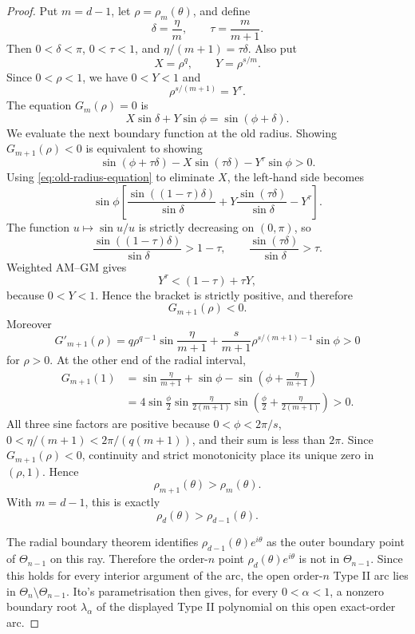 \documentclass[11pt]{article}
\theoremstyle{definition}
\theoremstyle{remark}
\begin{document}
\begin{proof}
Put $m=d-1$, let $\rho=\rho_m(\theta)$, and define
\[
        \delta=\frac{\eta}{m},
        \qquad
        \tau=\frac{m}{m+1} .
\]
Then $0<\delta<\pi$, $0<\tau<1$, and $\eta/(m+1)=\tau\delta$.  Also put
\[
        X=\rho^q,
        \qquad
        Y=\rho^{s/m} .
\]
Since $0<\rho<1$, we have $0<Y<1$ and
\[
        \rho^{s/(m+1)}=Y^\tau .
\]
The equation $G_m(\rho)=0$ is
\begin{equation}
        X\sin\delta+Y\sin\phi=\sin(\phi+\delta).
        \label{eq:old-radius-equation}
\end{equation}
We evaluate the next boundary function at the old radius.  Showing $G_{m+1}(\rho)<0$ is equivalent to showing
\[
        \sin(\phi+\tau\delta)
        -X\sin(\tau\delta)
        -Y^\tau\sin\phi
        >0 .
\]
Using \eqref{eq:old-radius-equation} to eliminate $X$, the left-hand side becomes
\[
        \sin\phi
        \left[
        \frac{\sin((1-\tau)\delta)}{\sin\delta}
        +
        Y\frac{\sin(\tau\delta)}{\sin\delta}
        -
        Y^\tau
        \right].
\]
The function $u\mapsto \sin u/u$ is strictly decreasing on $(0,\pi)$, so
\[
        \frac{\sin((1-\tau)\delta)}{\sin\delta}>1-\tau,
        \qquad
        \frac{\sin(\tau\delta)}{\sin\delta}>\tau .
\]
Weighted AM--GM gives
\[
        Y^\tau<(1-\tau)+\tau Y,
\]
because $0<Y<1$.  Hence the bracket is strictly positive, and therefore
\[
        G_{m+1}(\rho)<0 .
\]
Moreover
\[
        G'_{m+1}(\rho)
        =
        q\rho^{q-1}\sin\frac{\eta}{m+1}
        +
        \frac{s}{m+1}\rho^{s/(m+1)-1}\sin\phi
        >0
\]
for $\rho>0$. At the other end of the radial interval,
\[
\begin{aligned}
G_{m+1}(1)
&=\sin\frac{\eta}{m+1}+\sin\phi
  -\sin\left(\phi+\frac{\eta}{m+1}\right)\\
&=4\sin\frac{\phi}{2}
    \sin\frac{\eta}{2(m+1)}
    \sin\left(\frac{\phi}{2}+\frac{\eta}{2(m+1)}\right)>0.
\end{aligned}
\]
All three sine factors are positive because
$0<\phi<2\pi/s$, $0<\eta/(m+1)<2\pi/(q(m+1))$, and their sum is less than $2\pi$. Since $G_{m+1}(\rho)<0$, continuity and strict monotonicity place its unique zero in $(\rho,1)$. Hence
\[
        \rho_{m+1}(\theta)>\rho_m(\theta).
\]
With $m=d-1$, this is exactly
\[
        \rho_d(\theta)>\rho_{d-1}(\theta).
\]

The radial boundary theorem identifies $\rho_{d-1}(\theta)e^{i\theta}$ as the outer boundary point of $\Theta_{n-1}$ on this ray.  Therefore the order-$n$ point $\rho_d(\theta)e^{i\theta}$ is not in $\Theta_{n-1}$.  Since this holds for every interior argument of the arc, the open order-$n$ Type II arc lies in $\Theta_n\setminus\Theta_{n-1}$.  Ito's parametrisation then gives, for every $0<\alpha<1$, a nonzero boundary root $\lambda_\alpha$ of the displayed Type II polynomial on this open exact-order arc.
\end{proof}
\end{document}
